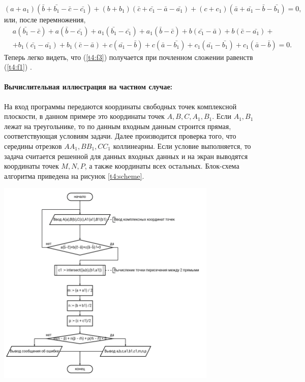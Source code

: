 {   \(
   (a+a_1)(\bar{b}+\bar{b_1}-\bar{c}-\bar{c_1})+(b+b_1 )(\bar{c}+\bar{c_1}-\bar{a}-\bar{a_1})+(c+c_1)(\bar{a}+\bar{a_1}-\bar{b}-\bar{b_1})=0,
   \) или, после перемножения,
   \begin{equation}
      \begin{aligned}
          & a(\bar{b_1} - \bar{c}) + a(\bar{b}- \bar{c_1}) + a_1(\bar{b_1} - \bar{c_1}) + a_1(\bar{b}- \bar{c}) + b(\bar{c_1} - \bar{a}) + b(\bar{c}- \bar{a_1}) + \\
          & +b_1(\bar{c_1}-\bar{a_1})+b_1 (\bar{c}-\bar{a})+c(\bar{a_1}-\bar{b})+c(\bar{a}-\bar{b_1})+c_1 (\bar{a_1}-\bar{b_1} )+c_1(\bar{a}-\bar{b})=0.
      \end{aligned}
      \label{t4:f3}
   \end{equation}
   Теперь легко видеть, что (\ref{t4:f3}) получается при почленном сложении
   равенств (\ref{t4:f1}) \cite[с. 27]{book:ponarin}.
   \paragraph{Вычислительная иллюстрация на частном случае:} На вход программы передаются координаты
   свободных точек комплексной плоскости, в данном примере это координаты точек \(A,B,C,A_1,B_1\). Если \(A_1,B_1\)
   лежат на треугольнике, то по данным входным данным строится прямая, соответствующая условиям задачи. Далее
   производится проверка того, что середины отрезков \(AA_1,BB_1,CC_1\) коллинеарны. Если условие выполняется, то задача
   считается решенной для данных входных данных и на экран выводятся координаты точек \(M,N,P\), а также координаты
   всех остальных. Блок-схема алгоритма приведена на рисунок \ref{t4:scheme}.
   \begin{center}
      \includegraphics[width=0.79\textwidth]{images/task4-diagram.png}
      \label{t4:scheme}
   \end{center}

}

